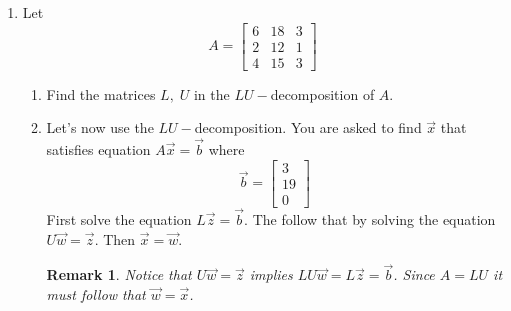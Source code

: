 \documentclass[12pt]{article}
\newtheorem*{remark}{Remark}
\begin{document}
\begin{enumerate}
\begin{enumerate}
	
\end{enumerate}


\item Let 
\[
A  =  \begin{bmatrix} 6 & 18 & 3   \\ 2 & 12 & 1  \\ 4 & 15 & 3   \end{bmatrix} 
\]
\begin{enumerate}
    \item Find the matrices $L, \; U$ in the $LU-$decomposition of $A$.
    \item Let's now use the $LU-$decomposition.  You are asked to find $\vec{x}$ that satisfies equation  $A \vec{x} = \vec{b}$ where 
    \[
    \vec{b} =  \begin{bmatrix} 3 \\ 19 \\ 0    \end{bmatrix} 
    \]
    First solve the equation $L \vec{z} = \vec{b}$.  The follow that by solving the equation $U\vec{w} = \vec{z}$.  Then $\vec{x} = \vec{w}$.  
    \begin{remark}  
    Notice that $U\vec{w} = \vec{z}$ implies $LU \vec{w} = L \vec{z} = \vec{b}$.  Since $A = LU$ it must follow that $\vec{w} = \vec{x}$.  
    \end{remark} 
\end{enumerate}


\end{enumerate}
\end{document}
